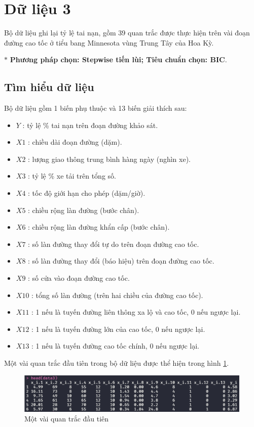 \section{Dữ liệu 3}

Bộ dữ liệu ghi lại tỷ lệ tai nạn, gồm 39 quan trắc được thực hiện trên vài đoạn đường cao tốc ở tiểu bang Minnesota vùng Trung Tây của Hoa Kỳ.

$*$ \textbf{Phương pháp chọn: Stepwise tiến lùi; Tiêu chuẩn chọn: BIC}.

\subsection*{Tìm hiểu dữ liệu}

Bộ dữ liệu gồm 1 biến phụ thuộc và 13 biến giải thích sau:
\begin{itemize}[label=--]
	\item $Y$ : tỷ lệ \% tai nạn trên đoạn đường khảo sát.
	\item $X1$ : chiều dài đoạn đường (dặm).
	\item $X2$ : lượng giao thông trung bình hàng ngày (nghìn xe).
	\item $X3$ : tỷ lệ \% xe tải trên tổng số.
	\item $X4$ : tốc độ giới hạn cho phép (dặm/giờ).
	\item $X5$ : chiều rộng làn đường (bước chân).
	\item $X6$ : chiều rộng làn đường khẩn cấp (bước chân).
	\item $X7$ : số làn đường thay đổi tự do trên đoạn đường cao tốc.
	\item $X8$ : số làn đường thay đổi (báo hiệu) trên đoạn đường cao tốc.
	\item $X9$ : số cửa vào đoạn đường cao tốc.
	\item $X10$ : tổng số làn đường (trên hai chiều của đường cao tốc).
	\item $X11$ : 1 nếu là tuyến đường liên thông xa lộ và cao tốc, 0 nếu ngược lại.
	\item $X12$ : 1 nếu là tuyến đường lớn của cao tốc, 0 nếu ngược lại.
	\item $X13$ : 1 nếu là tuyến đường cao tốc chính, 0 nếu ngược lại.
\end{itemize}

Một vài quan trắc đầu tiên trong bộ dữ liệu được thể hiện trong hình \ref{fig-b3:head-dataset}.
\begin{figure}[H]
	\centering
	\includegraphics[width=0.8\linewidth]{images/B3/head-dataset}
	\caption{Một vài quan trắc đầu tiên}
	\label{fig-b3:head-dataset}
\end{figure}

